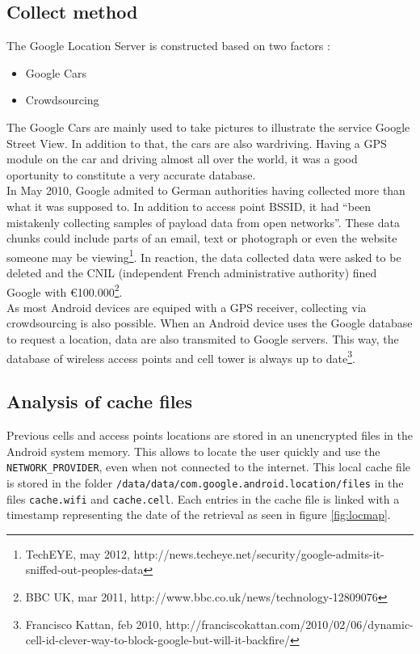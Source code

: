 \subsection{Collect method}
The Google Location Server is constructed based on two factors :
\begin{itemize}
\item Google Cars
\item Crowdsourcing
\end{itemize}

The Google Cars are mainly used to take pictures to illustrate the service Google Street View. In addition to that, the cars are also wardriving.  Having a GPS module on the car and driving almost all over the world, it was a good oportunity to constitute a very accurate database.\\

In May 2010, Google admited to German authorities having collected more than what it was supposed to. In addition to access point BSSID, it had ``been mistakenly collecting samples of payload data from open networks''. These data chunks could include parts of an email, text or photograph or even the website someone may be viewing\footnote{TechEYE, may 2012, http://news.techeye.net/security/google-admits-it-sniffed-out-peoples-data}. In reaction, the data collected data were asked to be deleted and the CNIL (independent French administrative authority) fined Google with €100.000\footnote{BBC UK, mar 2011, http://www.bbc.co.uk/news/technology-12809076}.\\

As most Android devices are equiped with a GPS receiver, collecting via crowdsourcing is also possible. When an Android device uses the Google database to request a location, data are also transmited to Google servers. This way, the database of wireless access points and cell tower is always up to date\footnote{Francisco Kattan, feb 2010, http://franciscokattan.com/2010/02/06/dynamic-cell-id-clever-way-to-block-google-but-will-it-backfire/}.

\subsection{Analysis of cache files}

Previous cells and access points locations are stored in an unencrypted files in the Android system memory. This allows to locate the user quickly and use the \texttt{NETWORK\_PROVIDER}, even when not connected to the internet. This local cache file is stored in the folder \texttt{/data/data/com.google.android.location/files} in the files \texttt{cache.wifi} and \texttt{cache.cell}. Each entries in the cache file is linked with a timestamp representing the date of the retrieval as seen in figure \ref{fig:locmap}.\\

